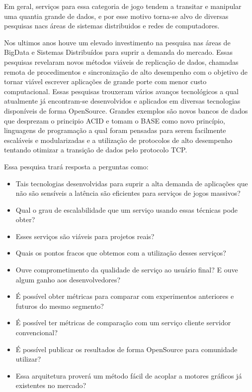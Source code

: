 Em geral, serviços para essa categoria de jogo tendem a transitar e manipular uma quantia grande de dados, e por esse motivo torna-se alvo de diversas pesquisas nacs áreas de sistemas distribuidos e redes de computadores.

Nos ultimos anos houve um elevado investimento na pesquisa nas áreas de BigData e Sistemas Distribuídos para suprir a demanda do mercado. Essas pesquisas revelaram novos métodos viáveis de replicação de dados, chamadas remota de procedimentos e sincronização de alto desempenho com o objetivo de tornar viável escrever aplicações de grande porte com menor custo computacional. Essas pesquisas trouxeram vários avanços tecnológicos a qual atualmente já encontram-se desenvolvidos e aplicados em diversas tecnologias disponíveis de forma OpenSource. Grandes exemplos são novos bancos de dados que desprezam o principio ACID e tomam o BASE como novo princípio, linguagens de programação a qual foram pensadas para serem facilmente escaláveis e modularizadas e a utilização de protocolos de alto desempenho tentando otimizar a transição de dados pelo protocolo TCP.

Essa pesquisa trará resposta a perguntas como:

\begin{itemize}
  \item Tais tecnologias desenvolvidas para suprir a alta demanda de aplicações que não são sensíveis a latência são eficientes para serviços de jogos massivos?
  \item Qual o grau de escalabilidade que um serviço usando essas técnicas pode obter?
  \item Esses serviços são viáveis para projetos reais?
  \item Quais os pontos fracos que obtemos com a utilização desses serviços?
  \item Ouve comprometimento da qualidade de serviço ao usuário final? E ouve algum ganho aos desenvolvedores?
  \item É possível obter métricas para comparar com experimentos anteriores e futuros do mesmo segmento?
  \item É possível ter métricas de comparação com um serviço cliente servidor convencional?
  \item É possível publicar os resultados de forma OpenSource para comunidade utilizar?
  \item Essa arquitetura proverá um método fácil de acoplar a motores gráficos já existentes no mercado?
\end{itemize}
